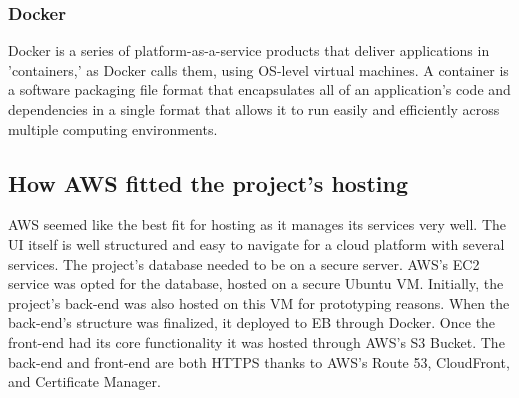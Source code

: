 \subsubsection{Docker}
Docker is a series of platform-as-a-service products that deliver applications in 'containers,' as Docker calls them, using OS-level virtual machines. A container is a software packaging file format that encapsulates all of an application's code and dependencies in a single format that allows it to run easily and efficiently across multiple computing environments.

\subsection{How AWS fitted the project's hosting}
AWS seemed like the best fit for hosting as it manages its services very well. The UI itself is well structured and easy to navigate for a cloud platform with several services. The project's database needed to be on a secure server. AWS's EC2 service was opted for the database, hosted on a secure Ubuntu VM. Initially, the project's back-end was also hosted on this VM for prototyping reasons. When the back-end's structure was finalized, it deployed to EB through Docker. Once the front-end had its core functionality it was hosted through AWS's S3 Bucket. The back-end and front-end are both HTTPS thanks to AWS's Route 53, CloudFront, and Certificate Manager.


